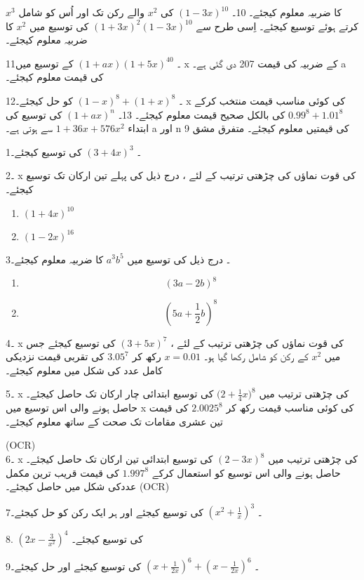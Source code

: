  \( {x}^{3}\)
کا ضربیہ معلوم کیجئے۔ 
10۔
\( {(1-3x)^{10}}\)
کی
 \({x}^{2}\)
والے رکن تک اور اُس کو شامل کرتے ہوئے  توسیع کیجئے۔
  اِسی طرح سے 
 \({(1+3x)^{2}}{(1-3x)^{10}}\)
کی توسیع میں  
 \( {x}^{2}\)
کا ضربیہ معلوم کیجئے۔

11۔
\({(1+ax)}{(1+5x)^{40}}\)
کے توسیع میں x  کے ضربیہ کی قیمت 207 دی گئی ہے۔  a کی قیمت معلوم کیجئے۔

12۔
\( {(1-x)^{8}}+{(1+x)^{8}}\)
کو حل کیجئے۔  x  کی کوئی مناسب قیمت منتخب کرکے
\( {0.99}^{8}+{1.01}^{8}\)
 کی بالکل صحیح قیمت معلوم کیجئے۔ 
13۔  
\( {(1+ax)^{n}}\)
کی  توسیع کی ابتداء  
 \(1+36{x}+576{x}^{2}\)
سے ہوتی ہے۔ a   اور n   کی قیمتیں معلوم کیجئے۔ 
متفرق مشق  
9

1۔  
\({(3+4x)}^{3}\)  
کی توسیع کیجئے۔ 

2۔  x کی قوت نماؤں کی چڑھتی ترتیب کے لئے ، درج ذیل کی پہلے تین ارکان تک توسیع کیجئے۔ 
\begin{enumerate}
\item
\({(1+4x)}^{10} \)
\item
\( {(1-2x)}^{16}\)
\end{enumerate}
3۔  درج ذیل کی توسیع میں
\( {a}^{3}{b}^{5}\) 
کا ضربیہ معلوم کیجئے۔ 
\begin{enumerate}
\item
  \[{(3a-2b)}^{8}\]
  \item
  \[ (5a+\frac{1}{2}b)^{8}\]
  \end{enumerate}
4۔   x کی قوت نماؤں کی چڑھتی ترتیب کے لئے ،
\({(3+5x)}^{7}\)
کی توسیع کیجئے جس  میں 
 \( x^{2}\)
کے رکن کو شامل رکھا گیا ہو۔    
\(x=0.01\)
رکھ کر
\({3.05}^{7}\)  
کی تقربی قیمت نزدیکی کامل عدد کی شکل میں معلوم کیجئے۔ 

5۔ x  کی چڑھتی ترتیب میں
\({(2}+\frac{1}{4}{x)}^{8}\)
کی توسیع ابتدائی چار ارکان تک حاصل کیجئے۔ حاصل ہونے والی اس توسیع میں x  کی کوئی مناسب قیمت رکھ کر 
 \({2.0025}^{8}\)
کی قیمت تین عشری مقامات تک صحت کے ساتھ معلوم کیجئے۔ 

(OCR)\\
6۔ x  کی چڑھتی ترتیب میں
  \({(2-3x)}^{8}\)
کی توسیع ابتدائی تین ارکان تک حاصل کیجئے۔ حاصل ہونے والی اس توسیع کو استعمال کرکے 
  \( {1.997}^{8}\)
کی قیمت  قریب ترین مکمل عددکی شکل میں حاصل کیجئے۔  (OCR)

7۔ 
\( ({x}^{2}+\frac{1}{x})^{3}\)
کی توسیع کیجئے اور ہر ایک رکن کو حل کیجئے۔ 


  8.
  \(({2x}-\frac{3}{x^{2}})^{4}\)
کی توسیع کیجئے۔

9۔
\( ({x}+\frac{1}{2x})^{6}+({x}-\frac{1}{2x})^{6}\)
کی توسیع کیجئے اور حل کیجئے۔

